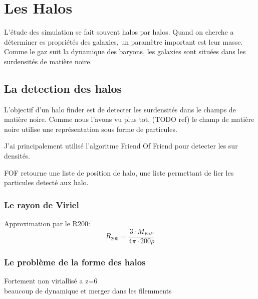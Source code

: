\chapter{Les Halos}

L'étude des simulation se fait souvent halos par halos.
Quand on cherche a déterminer es propriétés des galaxies, un paramètre important est leur masse.
Comme le gaz suit la dynamique des baryons, les galaxies sont situées dans les surdensités de matière noire.




\section{La detection des halos}

L'objectif d'un halo finder est de detecter les surdensités dans le champs de matière noire.
Comme nous l'avons vu plus tot, (TODO ref) le champ de matière noire utilise une représentation sous forme de particules.

J'ai principalement utilisé l'algoritme Friend Of Friend pour detecter les sur densités.

FOF retourne une liste de position de halo, une liste permettant de lier les particules detecté aux halo.

\subsection{Le rayon de Viriel}
Approximation par le R200:
\begin{equation}
R_{200}=\frac{3\cdot M_{FoF} }{4\pi\cdot 200 \bar{\rho} }
\end{equation}


\subsection{Le problème de la forme des halos}
Fortement non viriallisé a z=6\\
beaucoup de dynamique et merger dans les filemments

